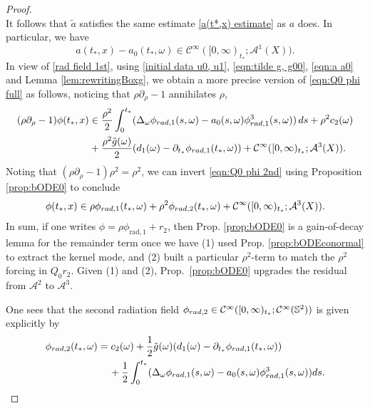 \documentclass[10pt,a4paper,reqno]{amsart}
\newcommand{\CI}{\mathcal{C}^\infty}
\newcommand{\A}{\mathcal{A}}
\newcommand{\pa}{\partial}
\newcommand{\ti}{\tilde}
\renewcommand{\S}{{\mathbb S}}
\theoremstyle{definition}
\theoremstyle{remark}
\numberwithin{equation}{section}
\newcommand{\ts}{t_*}
\begin{document}
\begin{proof}
\begin{equation}
\end{equation}
It follows that $\tilde{a}$ satisfies the same estimate \eqref{a(t*,x) estimate} as $a$ does. In particular, we have
\begin{equation}
\label{eqn:a a0}
    a(\ts,x) - a_0(\ts,\omega) \in \CI([0,\infty)_{\ts};\A^{1}(X)).
\end{equation}
In view of \eqref{rad field 1st}, using \eqref{initial data u0, u1}, \eqref{eqn:tilde g, g00}, \eqref{eqn:a a0} and Lemma \ref{lem:rewritingBoxg}, we obtain a more precise version of \eqref{eqn:Q0 phi full} as follows, noticing that $\rho \pa_\rho -1$ annihilates $\rho$,
    \begin{equation}
		\label{eqn:Q0 phi 2nd}
		\begin{split}
			(\rho\pa_{\rho}-1)\phi(t_*,x) &\in
   \frac{\rho^2}{2}\int_0^{\ts} (\Delta_\omega\phi_{\rm{rad},1}(s,\omega)-a_0(s,\omega)\phi_{\rm{rad},1}^3(s,\omega)) \,ds + 
   \rho^2 c_2(\omega) \\
			&+ \frac{\rho^2 \ti g(\omega)}{2}(d_1(\omega) - \pa_{\ts}\phi_{\rm{rad},1}(\ts,\omega)) +   \CI([0,\infty)_{\ts};\A^{3}(X)).
		\end{split}
	\end{equation}
Noting that $(\rho \pa_{\rho} - 1)\rho^2 = \rho^2$, we can invert \eqref{eqn:Q0 phi 2nd} using Proposition \ref{prop:bODE0} to conclude
	\begin{equation*}
	    \phi(\ts,x) \in \rho\phi_{\rm{rad},1}(\ts,\omega) + \rho^2\phi_{\rm{rad},2}(\ts,\omega) + \CI([0,\infty)_{t_*}; \A^{3}(X)).
	\end{equation*}
In sum, if one writes $\phi = \rho \phi_{\mathrm{rad},1}+r_2$, then Prop. \ref{prop:bODE0} is a gain-of-decay lemma for the remainder term once we have (1) used Prop. \ref{prop:bODEconormal} to extract the kernel mode, and (2) built a particular $\rho^2$-term to match the $\rho^2$ forcing in $Q_0r_2$. Given (1) and (2), Prop.~\ref{prop:bODE0} upgrades the residual from $\mathcal A^2$ to $\mathcal A^3$.

One sees that the second radiation field $\phi_{\rm{rad},2}\in \CI([0,\infty)_{t_*};\CI(\S^2))$ is given explicitly by
	\begin{equation*}
		\begin{split}
			\phi_{\rm{rad},2}(\ts,\omega) &= c_2(\omega) + \frac{1}{2}\ti g(\omega) ( d_1(\omega) - \pa_{\ts}\phi_{\rm{rad},1}(\ts,\omega) ) \\ 
			&\quad\, + \frac{1}{2}\int_0^{\ts} (\Delta_\omega\phi_{\rm{rad},1}(s,\omega)-a_0(s,\omega)\phi_{\rm{rad},1}^3(s,\omega)) ds.
		\end{split}
	\end{equation*} 
\end{proof}
\end{document}
